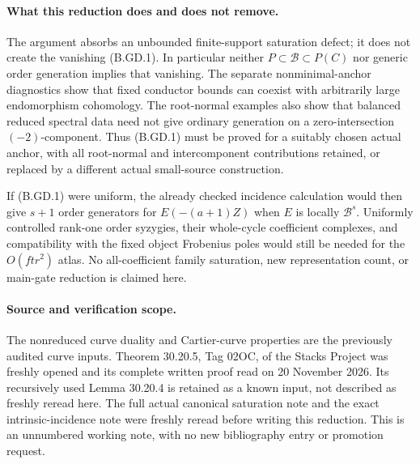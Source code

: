 \paragraph{What this reduction does and does not remove.}
The argument absorbs an unbounded finite-support saturation defect;
it does not create the vanishing (B.GD.1).  In particular neither
$P\subset\mathcal B\subset P(C)$ nor generic order generation implies
that vanishing.  The separate nonminimal-anchor diagnostics show that
fixed conductor bounds can coexist with arbitrarily large endomorphism
cohomology.  The root-normal examples also show that balanced reduced
spectral data need not give ordinary generation on a zero-intersection
$(-2)$-component.  Thus (B.GD.1) must be proved for a suitably chosen
actual anchor, with all root-normal and intercomponent contributions
retained, or replaced by a different actual small-source construction.

If (B.GD.1) were uniform, the already checked incidence calculation
would then give $s+1$ order generators for $E(-(a+1)Z)$ when $E$ is
locally $\mathcal B^s$.  Uniformly controlled rank-one order syzygies,
their whole-cycle coefficient complexes, and compatibility with the
fixed object Frobenius poles would still be needed for the
$O(ftr^2)$ atlas.  No all-coefficient family saturation, new
representation count, or main-gate reduction is claimed here.

\paragraph{Source and verification scope.}
The nonreduced curve duality and Cartier-curve properties are the
previously audited curve inputs.  Theorem 30.20.5, Tag 02OC, of the
Stacks Project was freshly opened and its complete written proof read
on 20 November 2026.  Its recursively used Lemma 30.20.4 is retained as
a known input, not described as freshly reread here.  The full actual
canonical saturation note and the exact intrinsic-incidence note were
freshly reread before writing this reduction.  This is an unnumbered
working note, with no new bibliography entry or promotion request.
